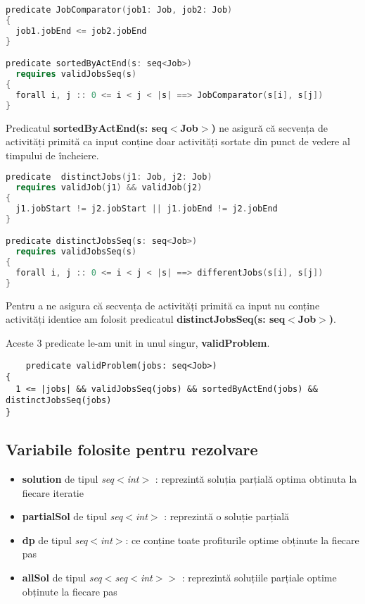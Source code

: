 \begin{lstlisting}[language=C++]
predicate JobComparator(job1: Job, job2: Job)
{
  job1.jobEnd <= job2.jobEnd
}

predicate sortedByActEnd(s: seq<Job>)
  requires validJobsSeq(s)
{
  forall i, j :: 0 <= i < j < |s| ==> JobComparator(s[i], s[j])
}
\end{lstlisting}

Predicatul \textbf{sortedByActEnd(s: seq$<$Job$>$)} ne asigură că secvența de activități primită ca input conține doar activități sortate din punct de vedere al timpului de încheiere. 

\begin{lstlisting}[language=C++]
predicate  distinctJobs(j1: Job, j2: Job)
  requires validJob(j1) && validJob(j2)
{
  j1.jobStart != j2.jobStart || j1.jobEnd != j2.jobEnd
}

predicate distinctJobsSeq(s: seq<Job>)
  requires validJobsSeq(s)
{
  forall i, j :: 0 <= i < j < |s| ==> differentJobs(s[i], s[j])
}
\end{lstlisting}
Pentru a ne asigura că secvența de activități primită ca input nu conține activități identice am folosit predicatul \textbf{distinctJobsSeq(s: seq$<$Job$>$)}. 

Aceste 3 predicate le-am unit in unul singur, \textbf{validProblem}.

\begin{lstlisting}
    predicate validProblem(jobs: seq<Job>)
{
  1 <= |jobs| && validJobsSeq(jobs) && sortedByActEnd(jobs) && distinctJobsSeq(jobs)
}
\end{lstlisting}
    
\subsection{Variabile folosite pentru rezolvare}
\begin{itemize}
    \item \textbf{solution} de tipul \textit{seq$<$int$>$} : reprezintă soluția parțială optima obtinuta la fiecare iteratie
    \item \textbf{partialSol} de tipul \textit{seq$<$int$>$} : reprezintă o soluție parțială
    \item \textbf{dp} de tipul \textit{seq$<$int$>$}:
    ce conține toate profiturile optime obținute la fiecare pas
    \item \textbf{allSol} de tipul \textit{seq$<$seq$<$int$>$$>$} : reprezintă soluțiile parțiale optime obținute la fiecare pas
   
\end{itemize}

